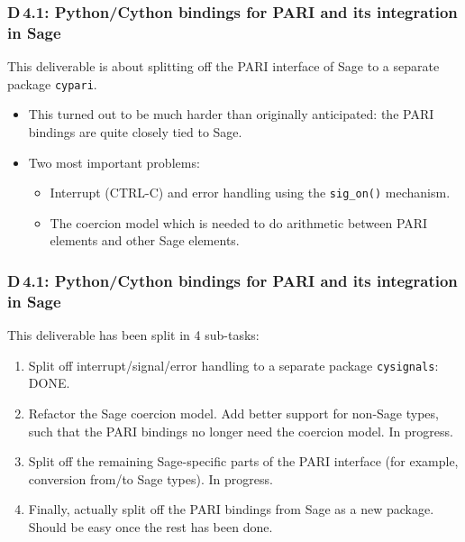\documentclass{beamer}
\begin{document}
\begin{frame}
\frametitle{D\,4.1: Python/Cython bindings for PARI and its integration in Sage}

This deliverable is about splitting off the PARI interface of Sage
to a separate package \texttt{cypari}.

\begin{itemize}
\item This turned out to be much harder than originally anticipated:
the PARI bindings are quite closely tied to Sage.

\item Two most important problems:
\begin{itemize}
\item Interrupt (CTRL-C) and error handling using the \texttt{sig\_on()} mechanism.

\item The coercion model which is needed to do arithmetic between PARI elements
and other Sage elements.
\end{itemize}
\end{itemize}
\end{frame}

\begin{frame}
\frametitle{D\,4.1: Python/Cython bindings for PARI and its integration in Sage}
This deliverable has been split in 4 sub-tasks:
\begin{enumerate}
\item Split off interrupt/signal/error handling to a separate package \texttt{cysignals}:
DONE.

\item Refactor the Sage coercion model. Add better support for non-Sage types,
such that the PARI bindings no longer need the coercion model.
In progress.

\item Split off the remaining Sage-specific parts of the PARI interface
(for example, conversion from/to Sage types).
In progress.

\item Finally, actually split off the PARI bindings from Sage as a new package.
Should be easy once the rest has been done.
\end{enumerate}
\end{frame}
\end{document}
